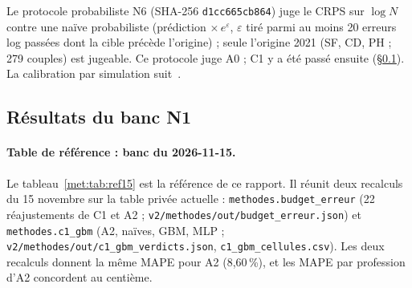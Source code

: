 Le protocole probabiliste N6 (SHA-256 \texttt{d1cc665cb864}) juge le CRPS sur $\log N$~\cite{b-gneiting2007jasa}
contre une naïve probabiliste (prédiction $\times\,e^{\varepsilon}$, $\varepsilon$ tiré parmi au moins 20
erreurs log passées dont la cible précède l'origine) ; seule l'origine 2021 (SF, CD, PH ; 279 couples\mesure)
est jugeable. Ce protocole juge A0 ; C1 y a été passé ensuite (\S\ref{met:resultats}). La calibration par
simulation suit~\cite{b-talts2018sbc}.

\subsection{Résultats du banc N1}
\label{met:resultats}

\paragraph{Table de référence : banc du 2026-11-15.} Le tableau~\ref{met:tab:ref15} est la référence de ce
rapport. Il réunit deux recalculs du 15 novembre sur la table privée actuelle : \texttt{methodes.budget\_erreur}
(22 réajustements de C1 et A2 ; \texttt{v2/methodes/out/budget\_erreur.json}) et \texttt{methodes.c1\_gbm}
(A2, naïves, GBM, MLP ; \texttt{v2/methodes/out/c1\_gbm\_verdicts.json}, \texttt{c1\_gbm\_cellules.csv}).
Les deux recalculs donnent la même MAPE pour A2 (8,60\,\%\mesure), et les MAPE par profession d'A2
concordent au centième.


